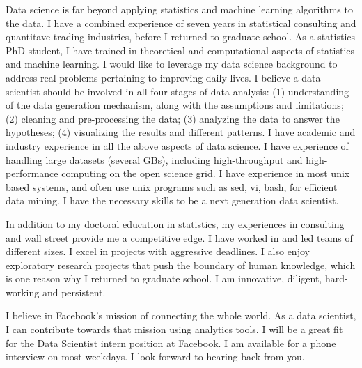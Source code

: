 \documentclass{letter} %
\begin{document}
\begin{letter}
\noindent %
Data science is far beyond applying statistics and machine learning algorithms to the data. I have a combined experience of seven years in statistical consulting and quantitave trading industries, before I returned to graduate school. As a statistics PhD student, I have trained in theoretical and computational aspects of statistics and machine learning. I would like to leverage my data science background to address real problems pertaining to improving daily lives. I believe a data scientist should be involved in all four stages of data analysis: (1) understanding of the data generation mechanism, along with the assumptions and limitations; (2) cleaning and pre-processing the data; (3) analyzing the data to answer the hypotheses; (4) visualizing the results and different patterns. I have academic and industry experience in all the above aspects of data science. I have experience of handling large datasets (several GBs), including high-throughput and high-performance computing on the \href{http://www.opensciencegrid.org/}{open science grid}. I have experience in most unix based systems, and often use unix programs such as sed, vi, bash, for efficient data mining. I have the necessary skills to be a next generation data scientist. 

In addition to my doctoral education in statistics, my experiences in consulting and wall street provide me a competitive edge. I have worked in and led teams of different sizes. I excel in projects with aggressive deadlines. I also enjoy exploratory research projects that push the boundary of human knowledge, which is one reason why I returned to graduate school. I am innovative, diligent, hard-working and persistent. 

\noindent %
I believe in Facebook's mission of connecting the whole world. As a data scientist, I can contribute towards that mission using analytics tools. I will be a great fit for the Data Scientist intern position at Facebook. I am available for a phone interview on most weekdays. I look forward to hearing back from you.


\end{letter}
\end{document}
